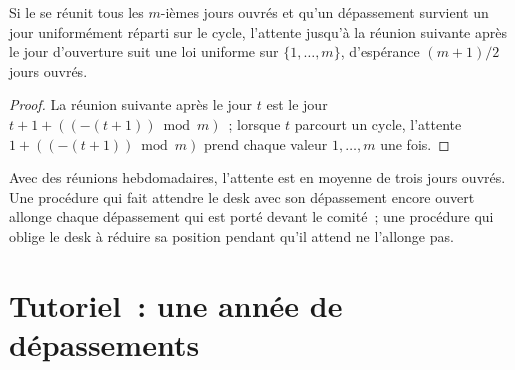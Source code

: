 \begin{proposition}\label{prop:fm:the-risk-management-function:wait}
Si le  se réunit tous les $m$-ièmes jours ouvrés et qu'un dépassement survient un jour uniformément réparti sur le cycle, l'attente
jusqu'à la réunion suivante après le jour d'ouverture suit une loi uniforme sur $\{1,\dots,m\}$, d'espérance $(m+1)/2$ jours ouvrés.
\end{proposition}

\begin{proof}
La réunion suivante après le jour $t$ est le jour $t+1+((-(t+1))\bmod m)$~; lorsque $t$ parcourt un cycle, l'attente $1+((-(t+1))\bmod m)$ prend chaque valeur
$1,\dots,m$ une fois.
\end{proof}

Avec des réunions hebdomadaires, l'attente est en moyenne de trois jours ouvrés. Une procédure qui fait attendre le desk avec son dépassement encore ouvert allonge chaque dépassement
qui est porté devant le comité~; une procédure qui oblige le desk à réduire sa position pendant qu'il attend ne l'allonge pas.

\section{Tutoriel~: une année de dépassements}\label{tut:fm:the-risk-management-function:tut}

